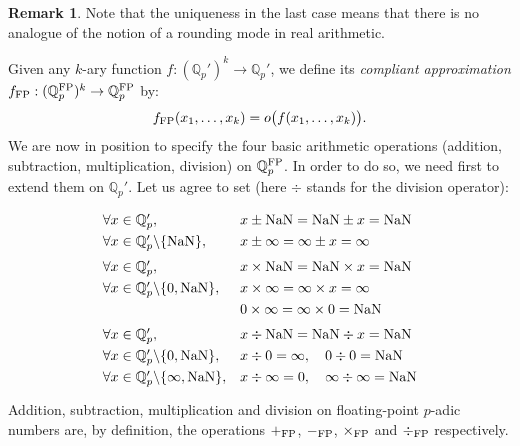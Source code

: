 \documentclass[11pt]{article}
\numberwithin{equation}{section}
\numberwithin{figure}{section}
\theoremstyle{definition}
\newtheorem{rem}[theo]{Remark}
\newcommand{\Q}{\mathbb Q}
\newcommand{\Qp}{\Q_p}
\newcommand{\nan}{\text{\rm NaN}}
\newcommand{\FP}{\text{\rm FP}}
\newcommand{\QpFP}{\Qp^{\FP}}
\newcommand{\QpNan}{\Qp'}
\begin{document}
\begin{rem}
Note that the uniqueness in the last case means that there is no 
analogue of the notion of a rounding mode in real arithmetic.
\end{rem}

Given any $k$-ary function $f : (\QpNan)^k \to \QpNan$, we define its 
\emph{compliant approximation} $f_\FP : (\QpFP)^k \to \QpFP$ by:
$$f_\FP(x_1, \ldots, x_k) = o \big(f(x_1, \ldots, x_k)\big).$$
We are now in position to specify the four basic arithmetic operations 
(addition, subtraction, multiplication, division) on $\QpFP$. In order 
to do so, we need first to extend them on $\QpNan$. Let us agree to set
(here $\div$ stands for the division operator):

$$\begin{array}{ll}
\forall x \in \QpNan, 
  & x \pm \nan = \nan \pm x = \nan \smallskip \\
\forall x \in \QpNan \backslash \{\nan\}, 
  & x \pm \infty = \infty \pm x = \infty \medskip \\

\forall x \in \QpNan,
  & x \times \nan = \nan \times x = \nan \smallskip \\
\forall x \in \QpNan \backslash \{0, \nan\}, 
  & x \times \infty = \infty \times x = \infty \smallskip \\
  & 0 \times \infty = \infty \times 0 = \nan \medskip \\

\forall x \in \QpNan,
  & x \div \nan = \nan \div x = \nan \smallskip \\
\forall x \in \QpNan \backslash \{0, \nan\}, 
  & x \div 0 = \infty, \quad 0 \div 0 = \nan \smallskip \\
\forall x \in \QpNan \backslash \{\infty, \nan\}, 
  & x \div \infty = 0, \quad \infty \div \infty = \nan \smallskip \\
\end{array}$$
Addition, subtraction, multiplication and division 
on floating-point $p$-adic numbers are, by definition, the operations
$+_\FP$, $-_\FP$, $\times_\FP$ and $\div_\FP$ respectively.

\smallskip
\end{document}

